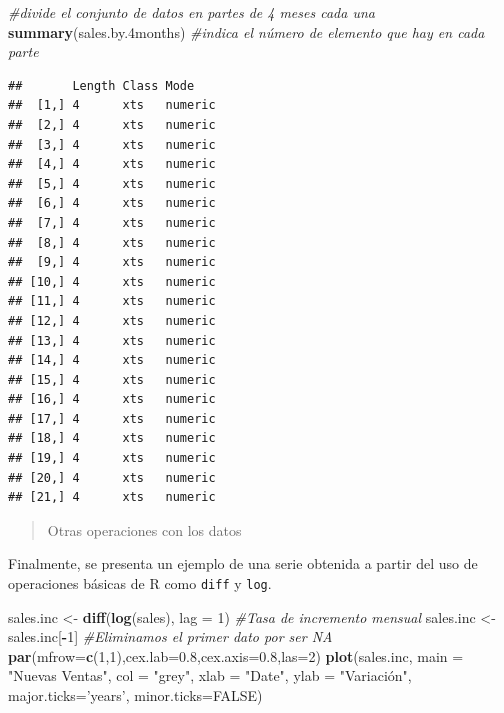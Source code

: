 \documentclass[]{book}
\newenvironment{Shaded}{\begin{snugshade}}{\end{snugshade}}
\newcommand{\CommentTok}[1]{\textcolor[rgb]{0.56,0.35,0.01}{\textit{#1}}}
\newcommand{\DataTypeTok}[1]{\textcolor[rgb]{0.13,0.29,0.53}{#1}}
\newcommand{\DecValTok}[1]{\textcolor[rgb]{0.00,0.00,0.81}{#1}}
\newcommand{\FloatTok}[1]{\textcolor[rgb]{0.00,0.00,0.81}{#1}}
\newcommand{\KeywordTok}[1]{\textcolor[rgb]{0.13,0.29,0.53}{\textbf{#1}}}
\newcommand{\NormalTok}[1]{#1}
\newcommand{\OperatorTok}[1]{\textcolor[rgb]{0.81,0.36,0.00}{\textbf{#1}}}
\newcommand{\StringTok}[1]{\textcolor[rgb]{0.31,0.60,0.02}{#1}}
\begin{document}
\begin{Shaded}
\begin{Highlighting}[]
 \CommentTok{#divide el conjunto de datos en partes de 4 meses cada una}
\KeywordTok{summary}\NormalTok{(sales.by}\FloatTok{.4}\NormalTok{months) }\CommentTok{#indica el número de elemento que hay en cada parte}
\end{Highlighting}
\end{Shaded}

\begin{verbatim}
##       Length Class Mode   
##  [1,] 4      xts   numeric
##  [2,] 4      xts   numeric
##  [3,] 4      xts   numeric
##  [4,] 4      xts   numeric
##  [5,] 4      xts   numeric
##  [6,] 4      xts   numeric
##  [7,] 4      xts   numeric
##  [8,] 4      xts   numeric
##  [9,] 4      xts   numeric
## [10,] 4      xts   numeric
## [11,] 4      xts   numeric
## [12,] 4      xts   numeric
## [13,] 4      xts   numeric
## [14,] 4      xts   numeric
## [15,] 4      xts   numeric
## [16,] 4      xts   numeric
## [17,] 4      xts   numeric
## [18,] 4      xts   numeric
## [19,] 4      xts   numeric
## [20,] 4      xts   numeric
## [21,] 4      xts   numeric
\end{verbatim}

\begin{quote}
Otras operaciones con los datos
\end{quote}

Finalmente, se presenta un ejemplo de una serie obtenida a partir del uso de operaciones básicas de R como \texttt{diff} y \texttt{log}.

\begin{Shaded}
\begin{Highlighting}[]
\NormalTok{sales.inc <-}\StringTok{ }\KeywordTok{diff}\NormalTok{(}\KeywordTok{log}\NormalTok{(sales), }\DataTypeTok{lag =} \DecValTok{1}\NormalTok{) }\CommentTok{#Tasa de incremento mensual}
\NormalTok{sales.inc <-}\StringTok{ }\NormalTok{sales.inc[}\OperatorTok{-}\DecValTok{1}\NormalTok{] }\CommentTok{#Eliminamos el primer dato por ser NA}
\KeywordTok{par}\NormalTok{(}\DataTypeTok{mfrow=}\KeywordTok{c}\NormalTok{(}\DecValTok{1}\NormalTok{,}\DecValTok{1}\NormalTok{),}\DataTypeTok{cex.lab=}\FloatTok{0.8}\NormalTok{,}\DataTypeTok{cex.axis=}\FloatTok{0.8}\NormalTok{,}\DataTypeTok{las=}\DecValTok{2}\NormalTok{)}
\KeywordTok{plot}\NormalTok{(sales.inc, }\DataTypeTok{main =} \StringTok{"Nuevas Ventas"}\NormalTok{,}
     \DataTypeTok{col =} \StringTok{"grey"}\NormalTok{, }\DataTypeTok{xlab =} \StringTok{"Date"}\NormalTok{, }\DataTypeTok{ylab =} \StringTok{"Variación", major.ticks='years',}
\StringTok{     minor.ticks=FALSE)}
\end{Highlighting}
\end{Shaded}
\end{document}

